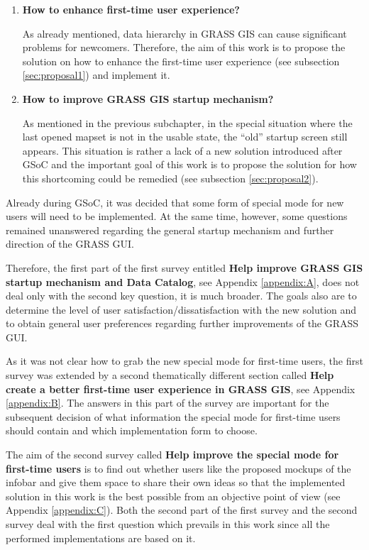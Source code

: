 \documentclass[a4paper,10pt,twoside]{article}
\begin{document}
\begin{enumerate}

\item  \noindent \textbf{How to enhance first-time user experience?}

  \noindent As already mentioned, data hierarchy in GRASS GIS can
  cause significant problems for newcomers. Therefore, the aim of this
  work is to propose the solution on how to enhance the first-time
  user experience (see subsection \ref{sec:proposal1}) and implement
  it.


\item \noindent \textbf{How to improve GRASS GIS startup mechanism?}

  As mentioned in the previous subchapter, in the special situation
  where the last opened mapset is not in the usable state, the ``old''
  startup screen still appears. This situation is rather a lack of a
  new solution introduced after GSoC and the important goal of this
  work is to propose the solution for how this shortcoming could be
  remedied (see subsection \ref{sec:proposal2}).

\end{enumerate}

\noindent Already during GSoC, it was decided that some form of
special mode for new users will need to be implemented. At the same
time, however, some questions remained unanswered regarding the
general startup mechanism and further direction of the GRASS GUI.

Therefore, the first part of the first survey entitled \textbf {Help
  improve GRASS GIS startup mechanism and Data Catalog}, see Appendix
\ref{appendix:A}, does not deal only with the second key question,
it is much broader. The goals also are to determine the level of user
satisfaction/dissatisfaction with the new solution and to obtain
general user preferences regarding further improvements of the GRASS
GUI.

As it was not clear how to grab the new special mode for first-time
users, the first survey was extended by a second thematically
different section called \textbf{Help create a better first-time user
  experience in GRASS GIS}, see Appendix \ref{appendix:B}. The answers
in this part of the survey are important for the subsequent decision
of what information the special mode for first-time users should
contain and which implementation form to choose.

The aim of the second survey called \textbf{Help improve the special
  mode for first-time users} is to find out whether users like the
proposed mockups of the infobar and give them space to share their
own ideas so that the implemented solution in this work is the best
possible from an objective point of view (see Appendix
\ref{appendix:C}). Both the second part of the first survey and the
second survey deal with the first question which prevails in this work
since all the performed implementations are based on it.
\end{document}
